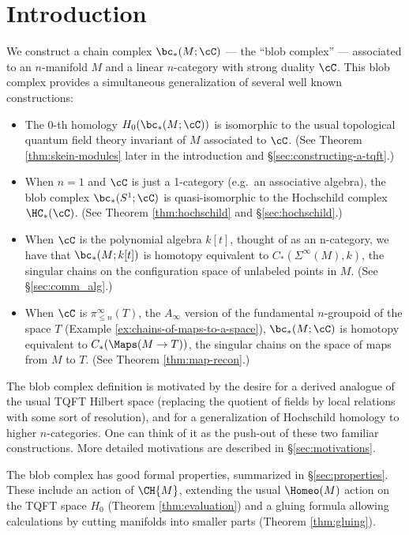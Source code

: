 
\section{Introduction}

We construct a chain complex $\bc_*(M; \cC)$ --- the ``blob complex'' --- 
associated to an $n$-manifold $M$ and a linear $n$-category with strong duality $\cC$.
This blob complex provides a simultaneous generalization of several well known constructions:
\begin{itemize}
\item The 0-th homology $H_0(\bc_*(M; \cC))$ is isomorphic to the usual 
topological quantum field theory invariant of $M$ associated to $\cC$.
(See Theorem \ref{thm:skein-modules} later in the introduction and \S \ref{sec:constructing-a-tqft}.)
\item When $n=1$ and $\cC$ is just a 1-category (e.g.\ an associative algebra), 
the blob complex $\bc_*(S^1; \cC)$ is quasi-isomorphic to the Hochschild complex $\HC_*(\cC)$.
(See Theorem \ref{thm:hochschild} and \S \ref{sec:hochschild}.)
\item When $\cC$ is the polynomial algebra $k[t]$, thought of as an n-category, we have 
that $\bc_*(M; k[t])$ is homotopy equivalent to $C_*(\Sigma^\infty(M), k)$, the singular chains
on the configuration space of unlabeled points in $M$. (See \S \ref{sec:comm_alg}.)
\item When $\cC$ is $\pi^\infty_{\leq n}(T)$, the $A_\infty$ version of the fundamental $n$-groupoid of
the space $T$ (Example \ref{ex:chains-of-maps-to-a-space}), 
$\bc_*(M; \cC)$ is homotopy equivalent to $C_*(\Maps(M\to T))$,
the singular chains on the space of maps from $M$ to $T$.
(See Theorem \ref{thm:map-recon}.)
\end{itemize}

The blob complex definition is motivated by the desire for a derived analogue of the usual TQFT Hilbert space 
(replacing the quotient of fields by local relations with some sort of resolution), 
and for a generalization of Hochschild homology to higher $n$-categories.
One can think of it as the push-out of these two familiar constructions.
More detailed motivations are described in \S \ref{sec:motivations}.

The blob complex has good formal properties, summarized in \S \ref{sec:properties}.
These include an action of $\CH{M}$, 
extending the usual $\Homeo(M)$ action on the TQFT space $H_0$ (Theorem \ref{thm:evaluation}) and a gluing 
formula allowing calculations by cutting manifolds into smaller parts (Theorem \ref{thm:gluing}).

